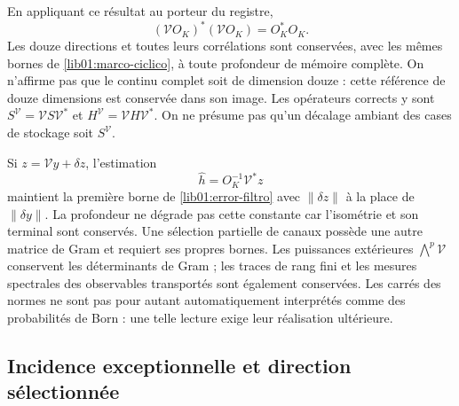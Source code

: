 En appliquant ce résultat au porteur du registre,
\begin{equation}
 (\mathcal VO_K)^*(\mathcal VO_K)=O_K^*O_K.
 \label{lib01:gram-memoria}
\end{equation}
Les douze directions et toutes leurs corrélations sont conservées, avec les
mêmes bornes de \cref{lib01:marco-ciclico}, à toute profondeur de
mémoire complète. On n’affirme pas que le continu complet soit de dimension
douze : cette référence de douze dimensions est conservée dans son image.
Les opérateurs corrects y sont
\(S^{\mathcal V}=\mathcal VS\mathcal V^*\) et
\(H^{\mathcal V}=\mathcal VH\mathcal V^*\). On ne présume pas qu’un
décalage ambiant des cases de stockage soit
\(S^{\mathcal V}\).

Si \(z=\mathcal Vy+\delta z\), l'estimation
\[
 \widehat h=O_K^{-1}\mathcal V^*z
\]
maintient la première borne de \eqref{lib01:error-filtro} avec \(\|\delta z\|\) à la place de \(\|\delta y\|\). La profondeur ne dégrade pas cette constante car l'isométrie et son terminal sont conservés. Une sélection partielle de canaux possède une autre matrice de Gram et requiert ses propres bornes. Les puissances extérieures \(\bigwedge^p\mathcal V\) conservent les déterminants de Gram ; les traces de rang fini et les mesures spectrales des observables transportés sont également conservées. Les carrés des normes ne sont pas pour autant automatiquement interprétés comme des probabilités de Born : une telle lecture exige leur réalisation ultérieure.

\subsection{Incidence exceptionnelle et direction sélectionnée}
\label{lib01:direccion}

